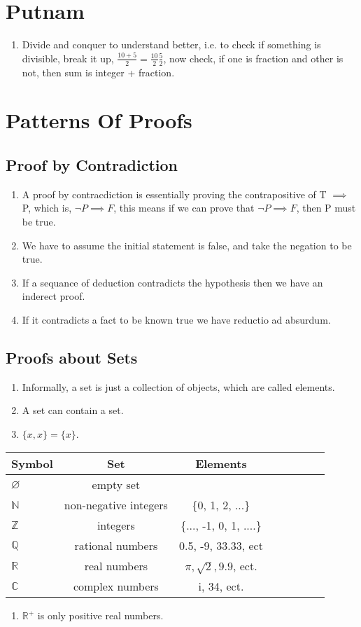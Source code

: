 \documentclass{article}
\begin{document}
	\section{Putnam}
	\begin{enumerate}
		\item  Divide and conquer to understand better, i.e. to check if something is divisible, break it up, $\frac{10 + 5}{2} = \frac{10}{2} \frac{5}{2}$, now check, if one is fraction and other is not, then sum is integer + fraction.
	\end{enumerate}
	\section{Patterns Of Proofs}
	\subsection{Proof by Contradiction}
\begin{enumerate}

\item A proof by contracdiction is essentially proving the contrapositive of T $\implies$ P, which is, $\neg P \implies F$, this means if we can prove that $\neg P \implies F$, then P must be true.
\item We have to assume the initial statement is false, and take the negation to be true.
\item If a sequance of deduction contradicts the hypothesis then we have an inderect proof.
\item If it contradicts a fact to be known true we have reductio ad absurdum.
\end{enumerate}
\subsection{Proofs about Sets}
\begin{enumerate}
	\item Informally, a set is just a collection of objects, which are called elements.
	\item A set can contain a set.
	\item $\{x, x\} = \{x\}$.
\end{enumerate}

\begin{tabular}{l*{6}{c}r}
Symbol          & Set & Elements\\
\hline
$\varnothing$ & empty set & \\
$\mathbb{N}$ & non-negative integers& \{0, 1, 2, ...\}  \\
$\mathbb{Z}$ & integers& \{..., -1, 0, 1, ....\}  \\
$\mathbb{Q}$ & rational numbers & 0.5, -9, 33.33, ect  \\
$\mathbb{R}$   &  real numbers & $\pi, \sqrt{2}, 9.9$,  ect. \\
$\mathbb{C}$  & complex numbers &  i, 34, ect.  \\
\end{tabular}
\begin{enumerate}
	\item $\mathbb{R}^{+}$ is only positive real numbers.
\end{enumerate}
\end{document}
